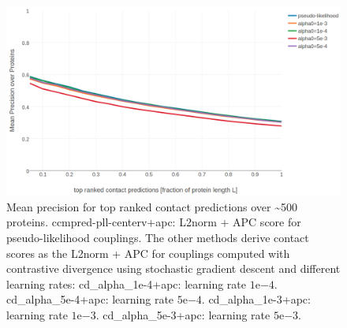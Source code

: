 \documentclass[12pt,a4paper,twoside]{book}
\theoremstyle{definition}
\theoremstyle{definition}
\theoremstyle{remark}
\begin{document}
\begin{figure}

{\centering \includegraphics[width=0.9\linewidth]{img/full_likelihood/alpha_opt_precision_vs_rank_notitle} 

}

\caption{Mean precision for top ranked
contact predictions over \textasciitilde{}500 proteins.
{ccmpred-pll-centerv+apc}: L2norm + APC score for pseudo-likelihood
couplings. The other methods derive contact scores as the L2norm + APC
for couplings computed with contrastive divergence using stochastic
gradient descent and different learning rates: {cd\_alpha\_1e-4+apc}:
learning rate \(1\mathrm{e}{-4}\). {cd\_alpha\_5e-4+apc}: learning rate
\(5\mathrm{e}{-4}\). {cd\_alpha\_1e-3+apc}: learning rate
\(1\mathrm{e}{-3}\). {cd\_alpha\_5e-3+apc}: learning rate
\(5\mathrm{e}{-3}\).}\label{fig:performance-cd-alphaopt}
\end{figure}
\end{document}
